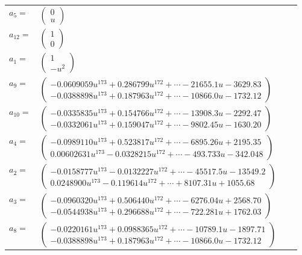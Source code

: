 \documentclass[1p]{elsarticle_modified}
\theoremstyle{definition}
\begin{document}
\begin{tabular}{m{7pt} m{180pt} m{7pt} m{180pt} }
\flushright $a_{5}=$&$\begin{pmatrix}0\\u\end{pmatrix}$ \\
\flushright $a_{12}=$&$\begin{pmatrix}1\\0\end{pmatrix}$ \\
\flushright $a_{1}=$&$\begin{pmatrix}1\\- u^2\end{pmatrix}$ \\
\flushright $a_{9}=$&$\begin{pmatrix}-0.0609059 u^{173}+0.286799 u^{172}+\cdots-21655.1 u-3629.83\\-0.0388898 u^{173}+0.187963 u^{172}+\cdots-10866.0 u-1732.12\end{pmatrix}$ \\
\flushright $a_{10}=$&$\begin{pmatrix}-0.0335835 u^{173}+0.154766 u^{172}+\cdots-13908.3 u-2292.47\\-0.0332061 u^{173}+0.159047 u^{172}+\cdots-9802.45 u-1630.20\end{pmatrix}$ \\
\flushright $a_{4}=$&$\begin{pmatrix}-0.0989110 u^{173}+0.523817 u^{172}+\cdots-6895.26 u+2195.35\\0.00602631 u^{173}-0.0328215 u^{172}+\cdots-493.733 u-342.048\end{pmatrix}$ \\
\flushright $a_{2}=$&$\begin{pmatrix}-0.0158777 u^{173}-0.0132227 u^{172}+\cdots-45517.5 u-13549.2\\0.0248900 u^{173}-0.119614 u^{172}+\cdots+8107.31 u+1055.68\end{pmatrix}$ \\
\flushright $a_{3}=$&$\begin{pmatrix}-0.0960320 u^{173}+0.506440 u^{172}+\cdots-6276.04 u+2568.70\\-0.0544938 u^{173}+0.296688 u^{172}+\cdots-722.281 u+1762.03\end{pmatrix}$ \\
\flushright $a_{8}=$&$\begin{pmatrix}-0.0220161 u^{173}+0.0988365 u^{172}+\cdots-10789.1 u-1897.71\\-0.0388898 u^{173}+0.187963 u^{172}+\cdots-10866.0 u-1732.12\end{pmatrix}$ \\

\end{tabular}
\end{document}
